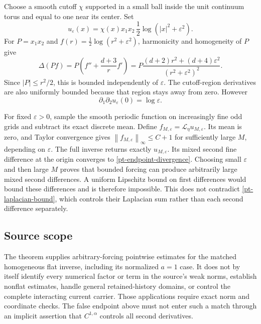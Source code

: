 \documentclass[11pt]{article}
\theoremstyle{remark}
\newcommand{\norm}[1]{\left\|#1\right\|}
\begin{document}
Choose a smooth cutoff $\chi$ supported in a small ball inside the
unit continuum torus and equal to one near its center. Set
\begin{equation}\label{pt-endpoint-example}
 u_\varepsilon(x)=\chi(x)x_1x_2\,
                       \frac12\log(|x|^2+\varepsilon^2).
\end{equation}
For $P=x_1x_2$ and $f(r)=\frac12\log(r^2+\varepsilon^2)$,
harmonicity and homogeneity of $P$ give
\begin{equation}\label{pt-endpoint-laplacian}
 \Delta(Pf)=P\left(f''+\frac{d+3}{r}f'\right)
   =P\frac{(d+2)r^2+(d+4)\varepsilon^2}
                  {(r^2+\varepsilon^2)^2}.
\end{equation}
Since $|P|\le r^2/2$, this is bounded independently of $\varepsilon$.
The cutoff-region derivatives are also uniformly bounded because
that region stays away from zero. However
\begin{equation}\label{pt-endpoint-divergence}
 \partial_1\partial_2u_\varepsilon(0)=\log\varepsilon.
\end{equation}

For fixed $\varepsilon>0$, sample the smooth periodic function on
increasingly fine odd grids and subtract its exact discrete mean.
Define $f_{M,\varepsilon}=\mathcal L_\eta u_{M,\varepsilon}$.
Its mean is zero, and Taylor convergence gives
$\norm{f_{M,\varepsilon}}_\infty\le C+1$ for sufficiently large
$M$, depending on $\varepsilon$. The full inverse returns exactly
$u_{M,\varepsilon}$. Its mixed second fine difference at the origin
converges to \eqref{pt-endpoint-divergence}. Choosing small
$\varepsilon$ and then large $M$ proves that bounded forcing can
produce arbitrarily large mixed second differences. A uniform
Lipschitz bound on first differences would bound these differences
and is therefore impossible. This does not contradict
\eqref{pt-laplacian-bound}, which controls their Laplacian sum rather
than each second difference separately.

\subsection{Source scope}

The theorem supplies arbitrary-forcing pointwise estimates for the
matched homogeneous flat inverse, including its normalized $a=1$
case. It does not by itself identify every numerical factor or term
in the source's weak norms, establish nonflat estimates, handle
general retained-history domains, or control the complete interacting
current carrier. Those applications require exact norm and coordinate
checks. The false endpoint above must not enter such a match through
an implicit assertion that $C^{1,\alpha}$ controls all second derivatives.
\end{document}
